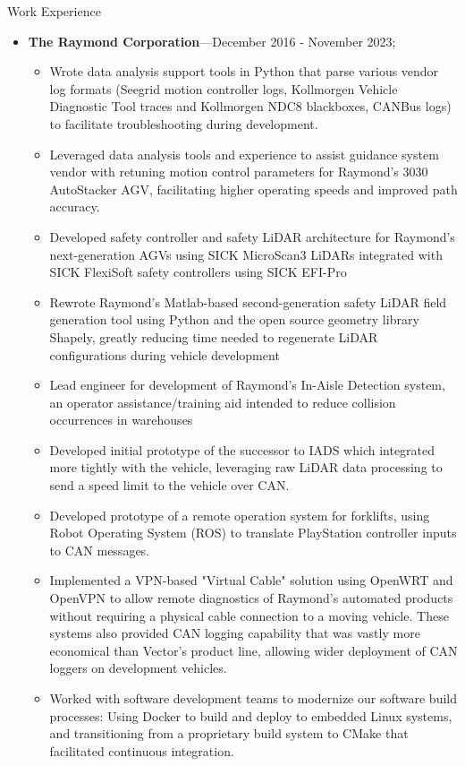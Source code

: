 \documentclass[10pt,oneside]{article}
\newenvironment{ressection}[1]{
	\vspace{4pt}
	{\Large#1}
	\begin{itemize}
	\vspace{3pt}
}{
	\end{itemize}
}
\newcommand{\ressubitem}[1]{
	\vspace{-1pt}
	\item \begin{flushleft} #1 \end{flushleft}
}
\newcommand{\resbigitem}[3]{
	\vspace{-5pt}
	\item
	\textbf{#1}---#2; \quad \textit{#3}
}
\newenvironment{ressubsec}[3]{
	\resbigitem{#1}{#2}{#3}
	\vspace{-2pt}
	\begin{itemize}
}{
	\end{itemize}
}
\newenvironment{ressection}[1]{
	\vspace{4pt}
	{\fontfamily{phv}\selectfont\Large#1}
	\begin{itemize}[leftmargin=12pt]
	\vspace{3pt}
}{
	\end{itemize}
}
\newcommand{\ressubitem}[1]{
	\vspace{-1pt}
	\item \begin{flushleft} #1 \end{flushleft}
}
\newcommand{\resbigitem}[2]{
	\vspace{-5pt}
	\item
	\textbf{#1}---\textit{#2}
}
\newenvironment{ressubsec}[2]{
	\resbigitem{#1}{#2}
	\vspace{-2pt}
	\begin{itemize}[leftmargin=12pt]
	}{
	\end{itemize}
}
\begin{document}
\begin{ressection}{Work Experience}

	\begin{ressubsec}{The Raymond Corporation}{December 2016 - November 2023}
		\ressubitem{Primary maintainer of obstruction detection subsystem for Raymond Courier AGVs - configuration of SICK FlexiSoft safety controller logic and SICK S300 safety LiDAR configuration}
		\ressubitem{Wrote data analysis support tools in Python that parse various vendor log formats (Seegrid motion controller logs, Kollmorgen Vehicle Diagnostic Tool traces and Kollmorgen NDC8 blackboxes, CANBus logs) to facilitate troubleshooting during development.}
		\ressubitem{Leveraged data analysis tools and experience to assist guidance system vendor with retuning motion control parameters for Raymond's 3030 AutoStacker AGV, facilitating higher operating speeds and improved path accuracy.}
		\ressubitem{Developed safety controller and safety LiDAR architecture for Raymond's next-generation AGVs using SICK MicroScan3 LiDARs integrated with SICK FlexiSoft safety controllers using SICK EFI-Pro}
		\ressubitem{Rewrote Raymond's Matlab-based second-generation safety LiDAR field generation tool using Python and the open source geometry library Shapely, greatly reducing time needed to regenerate LiDAR configurations during vehicle development}
		\ressubitem{Lead engineer for development of Raymond's In-Aisle Detection system, an operator assistance/training aid intended to reduce collision occurrences in warehouses}
		\ressubitem{Developed initial prototype of the successor to IADS which integrated more tightly with the vehicle, leveraging raw LiDAR data processing to send a speed limit to the vehicle over CAN.}
		\ressubitem{Developed prototype of a remote operation system for forklifts, using Robot Operating System (ROS) to translate PlayStation controller inputs to CAN messages.}
		\ressubitem{Implemented a VPN-based "Virtual Cable" solution using OpenWRT and OpenVPN to allow remote diagnostics of Raymond's automated products without requiring a physical cable connection to a moving vehicle.  These systems also provided CAN logging capability that was vastly more economical than Vector's product line, allowing wider deployment of CAN loggers on development vehicles.}
		\ressubitem{Worked with software development teams to modernize our software build processes:  Using Docker to build and deploy to embedded Linux systems, and transitioning from a proprietary build system to CMake that facilitated continuous integration. }
	\end{ressubsec}


\end{ressection}
\end{document}
